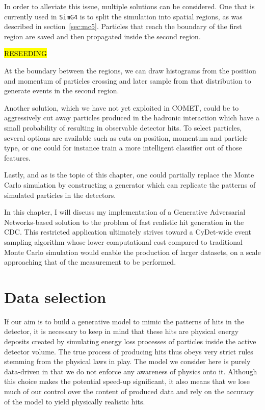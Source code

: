 In order to alleviate this issue, multiple solutions can be considered. One that is currently used in \texttt{SimG4} is to split the simulation into spatial regions, as was described in section~\ref{sec:mc5}. Particles that reach the boundary of the first region are saved and then propagated inside the second region. 

\hl{RESEEDING}

At the boundary between the regions, we can draw histograms from the position and momentum of particles crossing and later sample from that distribution to generate events in the second region.

Another solution, which we have not yet exploited in COMET, could be to aggressively cut away particles produced in the hadronic interaction which have a small probability of resulting in observable detector hits. To select particles, several options are available such as cuts on position, momentum and particle type, or one could for instance train a more intelligent classifier out of those features.

Lastly, and as is the topic of this chapter, one could partially replace the Monte Carlo simulation by constructing %
a generator which can replicate the patterns of simulated particles in the detectors.

In this chapter, I will discuss my implementation of a Generative Adversarial Networks-based solution to the problem of fast realistic hit generation in the CDC. This restricted application ultimately strives toward a CyDet-wide event sampling algorithm whose lower computational cost compared to traditional Monte Carlo simulation would enable the production of larger datasets, on a scale approaching that of the measurement to be performed.

\section{Data selection} %
If our aim is to build a generative model to mimic the patterns of hits in the detector, it is necessary to keep in mind that these hits are physical energy deposits created by simulating energy loss processes of particles inside the active detector volume. The true process of producing hits thus obeys very strict rules stemming from the physical laws in play. The model we consider here is purely data-driven in that we do not enforce any awareness of physics onto it. Although this choice makes the potential speed-up significant, it also means that we lose much of our control over the content of produced data and rely on the accuracy of the model to yield physically realistic hits.

